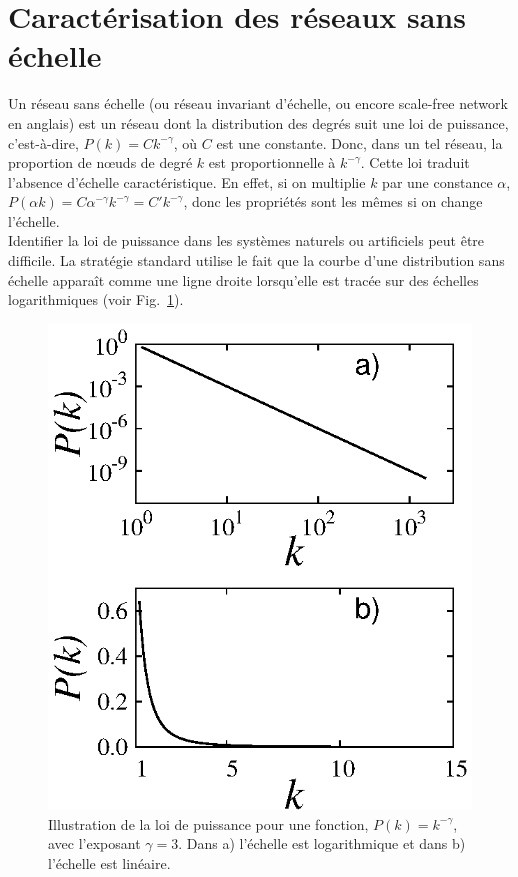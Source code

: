 \section{Caractérisation des réseaux sans échelle}
Un réseau sans échelle (ou réseau invariant d'échelle, ou encore scale-free network en anglais) est un réseau dont la distribution des degrés suit une loi de puissance, c'est-à-dire, $P(k)=Ck^{-\gamma}$, où $C$ est une constante.  Donc, dans un tel réseau, la proportion de nœuds de degré $k$ est proportionnelle à $k^{-\gamma}$. Cette loi traduit l'absence d'échelle caractéristique. En effet, si on multiplie $k$ par une constance $\alpha$, $P(\alpha k)=C\alpha^{-\gamma}k^{-\gamma}=C' k^{-\gamma}$, donc les propriétés sont les mêmes si on change l'échelle.\\ 
Identifier la loi de puissance dans les systèmes naturels ou artificiels peut être difficile. La stratégie standard utilise le fait que la courbe d'une distribution sans échelle apparaît comme une ligne droite lorsqu'elle est tracée sur des échelles logarithmiques (voir Fig.~\ref{sans-echelle-3}).
\begin{figure}[h!]
	\centering
	\includegraphics[scale=1.2]{./figures/fig-sans-echelle}
	\caption{Illustration de la loi de puissance pour une fonction, $P(k)=k^{-\gamma}$, avec l'exposant $\gamma=3$. Dans a) l'échelle est logarithmique et dans b) l'échelle est linéaire.}
	\label{sans-echelle-3}
\end{figure}
